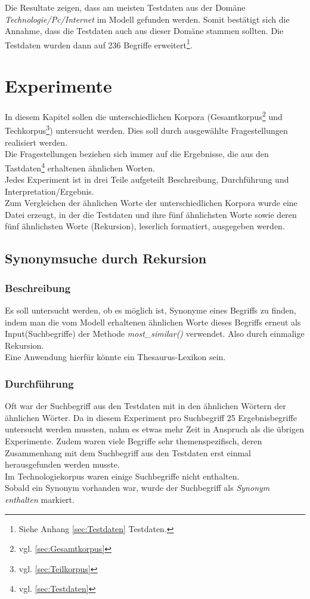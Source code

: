 \documentclass[12pt,a4paper]{report}
\begin{document}
Die Resultate zeigen, dass am meisten Testdaten aus der Domäne \textit{Technologie/Pc/Internet} im Modell gefunden werden.
Somit bestätigt sich die Annahme, dass die Testdaten auch aus dieser Domäne stammen sollten. 
Die Testdaten wurden dann auf 236 Begriffe erweitert\footnote{Siehe Anhang \ref{sec:Testdaten} Testdaten.}.
	
	
\newpage
\chapter{Experimente}
\label{chap:Experimente}
In diesem Kapitel sollen die unterschiedlichen Korpora (Gesamtkorpus\footnote{vgl. \ref{sec:Gesamtkorpus}} und Techkorpus\footnote{vgl. \ref{sec:Teilkorpus}}) untersucht werden. Dies soll durch ausgewählte Fragestellungen realisiert werden.
\\Die Fragestellungen beziehen sich immer auf die Ergebnisse, die aus den Tastdaten\footnote{vgl. \ref{sec:Testdaten}} erhaltenen ähnlichen Worten.
\\Jedes Experiment ist in drei Teile aufgeteilt Beschreibung, Durchführung und Interpretation/Ergebnis.\\
Zum Vergleichen der ähnlichen Worte der unterschiedlichen Korpora wurde eine Datei erzeugt, in der die Testdaten und ihre fünf ähnlichsten Worte sowie deren fünf ähnlichsten Worte (Rekursion), leserlich formatiert, ausgegeben werden.\\ 

	\section{Synonymsuche durch Rekursion}
\label{chap:Experiment1}
		\subsection{Beschreibung}
		Es soll untersucht werden, ob es möglich ist, Synonyme eines Begriffs zu finden, indem man die vom Modell erhaltenen ähnlichen Worte dieses Begriffs erneut als Input(Suchbegriffe) der Methode  \textit{most\_similar()} verwendet. Also durch einmalige Rekursion.\\
Eine Anwendung hierfür könnte ein Thesaurus-Lexikon sein.

		
		
		\subsection{Durchführung}
		Oft war der Suchbegriff aus den Testdaten mit in den ähnlichen Wörtern der ähnlichen Wörter. Da in diesem Experiment pro Suchbegriff 25 Ergebnisbegriffe untersucht werden mussten, nahm es etwas mehr Zeit in Anspruch als die übrigen Experimente. Zudem waren viele Begriffe sehr themenspezifisch, deren Zusammenhang mit dem Suchbegriff aus den Testdaten erst einmal herausgefunden werden musste.\\
		Im Technologiekorpus waren einige Suchbegriffe nicht enthalten.\\
		Sobald ein Synonym vorhanden war, wurde der Suchbegriff als \textit{Synonym enthalten} markiert.
	
\end{document}
